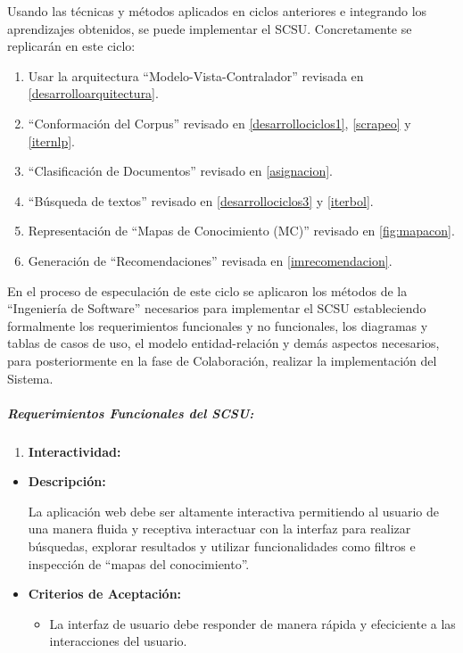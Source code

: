 \documentclass[
  12pt,
  openany]{book}
\providecommand{\tightlist}{%
  \setlength{\itemsep}{0pt}\setlength{\parskip}{0pt}}
\begin{document}
Usando las técnicas y métodos aplicados en ciclos anteriores e integrando los aprendizajes obtenidos, se puede implementar el SCSU. Concretamente se replicarán en este ciclo:

\begin{enumerate}
\def\labelenumi{\arabic{enumi}.}
\item
  Usar la arquitectura ``Modelo-Vista-Contralador'' revisada en \ref{desarrolloarquitectura}.
\item
  ``Conformación del Corpus'' revisado en \ref{desarrollociclos1}, \ref{scrapeo} y \ref{iternlp}.
\item
  ``Clasificación de Documentos'' revisado en \ref{asignacion}.
\item
  ``Búsqueda de textos'' revisado en \ref{desarrollociclos3} y \ref{iterbol}.
\item
  Representación de ``Mapas de Conocimiento (MC)'' revisado en \ref{fig:mapacon}.
\item
  Generación de ``Recomendaciones'' revisada en \ref{imrecomendacion}.
\end{enumerate}

En el proceso de especulación de este ciclo se aplicaron los métodos de la ``Ingeniería de Software'' necesarios para implementar el SCSU estableciendo formalmente los requerimientos funcionales y no funcionales, los diagramas y tablas de casos de uso, el modelo entidad-relación y demás aspectos necesarios, para posteriormente en la fase de Colaboración, realizar la implementación del Sistema.

\hypertarget{requerimientos-funcionales-del-scsu}{%
\subparagraph{\texorpdfstring{\textbf{Requerimientos Funcionales del SCSU:}}{Requerimientos Funcionales del SCSU:}}\label{requerimientos-funcionales-del-scsu}}

\begin{enumerate}
\def\labelenumi{\arabic{enumi}.}
\tightlist
\item
  \textbf{Interactividad:}
\end{enumerate}

\begin{itemize}
\item
  \textbf{Descripción:}

  La aplicación web debe ser altamente interactiva permitiendo al usuario de una manera fluida y receptiva interactuar con la interfaz para realizar búsquedas, explorar resultados y utilizar funcionalidades como filtros e inspección de ``mapas del conocimiento''.
\item
  \textbf{Criterios de Aceptación:}

  \begin{itemize}
  \tightlist
  \item
    La interfaz de usuario debe responder de manera rápida y efeciciente a las interacciones del usuario.
  \end{itemize}
\end{itemize}
\end{document}

